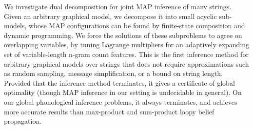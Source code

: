 We investigate dual decomposition for joint MAP inference of many strings. Given an arbitrary graphical model, we decompose it into small acyclic sub-models, whose MAP configurations can be found by finite-state composition and dynamic programming. We force the solutions of these subproblems to agree on overlapping variables, by tuning Lagrange multipliers for an adaptively expanding set of variable-length n-gram count features. This is the first inference method for arbitrary graphical models over strings that does not require approximations such as random sampling, message simplification, or a bound on string length. Provided that the inference method terminates, it gives a certificate of global optimality (though MAP inference in our setting is undecidable in general). On our global phonological inference problems, it always terminates, and achieves more accurate results than max-product and sum-product loopy belief propagation.
